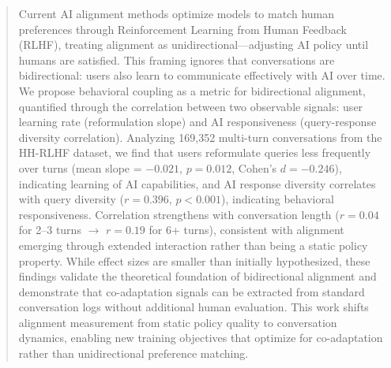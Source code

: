 \begin{abstract}
Current AI alignment methods optimize models to match human preferences through Reinforcement Learning from Human Feedback (RLHF), treating alignment as unidirectional---adjusting AI policy until humans are satisfied. This framing ignores that conversations are bidirectional: users also learn to communicate effectively with AI over time. We propose behavioral coupling as a metric for bidirectional alignment, quantified through the correlation between two observable signals: user learning rate (reformulation slope) and AI responsiveness (query-response diversity correlation). Analyzing 169,352 multi-turn conversations from the HH-RLHF dataset, we find that users reformulate queries less frequently over turns (mean slope = $-0.021$, $p=0.012$, Cohen's $d=-0.246$), indicating learning of AI capabilities, and AI response diversity correlates with query diversity ($r=0.396$, $p<0.001$), indicating behavioral responsiveness. Correlation strengthens with conversation length ($r=0.04$ for 2--3 turns $\rightarrow$ $r=0.19$ for 6+ turns), consistent with alignment emerging through extended interaction rather than being a static policy property. While effect sizes are smaller than initially hypothesized, these findings validate the theoretical foundation of bidirectional alignment and demonstrate that co-adaptation signals can be extracted from standard conversation logs without additional human evaluation. This work shifts alignment measurement from static policy quality to conversation dynamics, enabling new training objectives that optimize for co-adaptation rather than unidirectional preference matching.
\end{abstract}
